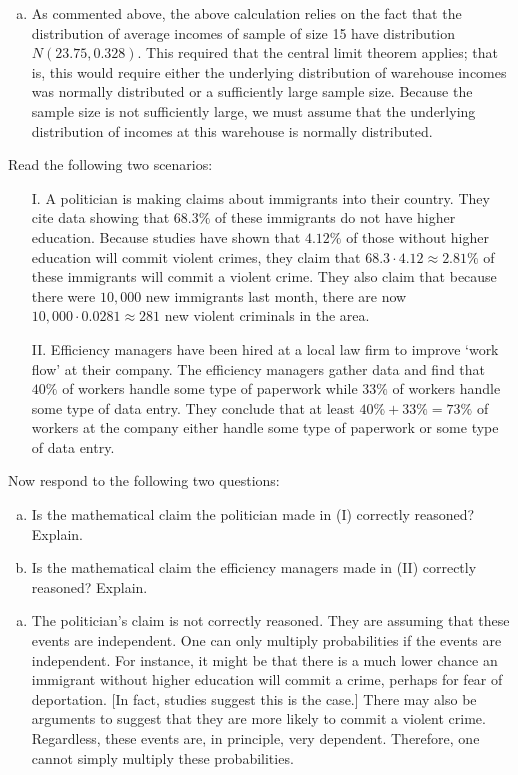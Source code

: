 \documentclass[12pt,letterpaper]{exam}
\begin{document}
\begin{questions}
{\begin{enumerate}[(a)]
\item As commented above, the above calculation relies on the fact that the distribution of average incomes of sample of size 15 have distribution $N(23.75, 0.328)$. This required that the central limit theorem applies; that is, this would require either the underlying distribution of warehouse incomes was normally distributed or a sufficiently large sample size. Because the sample size is not sufficiently large, we must assume that the underlying distribution of incomes at this warehouse is normally distributed. 
\end{enumerate}
}



\newpage
\question[10] Read the following two scenarios:
	\begin{enumerate}
	\item[I.] A politician is making claims about immigrants into their country. They cite data showing that $68.3\%$ of these immigrants do not have higher education. Because studies have shown that $4.12\%$ of those without higher education will commit violent crimes, they claim that $68.3 \cdot 4.12 \approx 2.81\%$ of these immigrants will commit a violent crime. They also claim that because there were $10,000$ new immigrants last month, there are now $10,\!000 \cdot 0.0281 \approx 281$ new violent criminals in the area.
	\item[II.] Efficiency managers have been hired at a local law firm to improve `work flow' at their company. The efficiency managers gather data and find that $40\%$ of workers handle some type of paperwork while $33\%$ of workers handle some type of data entry. They conclude that at least $40\% + 33\%= 73\%$ of workers at the company either handle some type of paperwork or some type of data entry. 
	\end{enumerate}
Now respond to the following two questions:

\begin{enumerate}[(a)]
\item Is the mathematical claim the politician made in (I) correctly reasoned? Explain.
\item Is the mathematical claim the efficiency managers made in (II) correctly reasoned? Explain.
\end{enumerate} \pspace

\sol 
{\itshape
\begin{enumerate}[(a)]
\item The politician's claim is not correctly reasoned. They are assuming that these events are independent. One can only multiply probabilities if the events are independent. For instance, it might be that there is a much lower chance an immigrant without higher education will commit a crime, perhaps for fear of deportation. [In fact, studies suggest this is the case.] There may also be arguments to suggest that they are more likely to commit a violent crime. Regardless, these events are, in principle, very dependent. Therefore, one cannot simply multiply these probabilities. \pspace


\end{enumerate}}
\end{questions}
\end{document}
